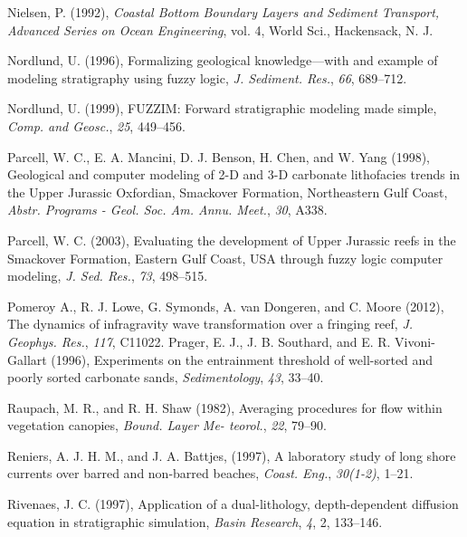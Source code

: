 \documentclass[default,jgrga]{agutex2015}
\begin{document}
\begin{article}
\begin{thebibliography}{}
Nielsen, P. (1992), \textit{Coastal Bottom Boundary Layers and Sediment Transport, Advanced Series on Ocean Engineering}, vol. 4, World Sci., Hackensack, N. J.

Nordlund, U. (1996), Formalizing geological knowledge—with and example of modeling stratigraphy using fuzzy logic, \textit{J. Sediment. Res.}, \textit{66}, 689--712.

Nordlund, U. (1999), FUZZIM: Forward stratigraphic modeling made simple, \textit{Comp. and Geosc.}, \textit{25}, 449--456.

Parcell, W. C., E. A. Mancini, D. J. Benson, H. Chen, and W. Yang (1998), Geological and computer modeling of 2-D and 3-D carbonate lithofacies trends in the Upper Jurassic Oxfordian, Smackover Formation, Northeastern Gulf Coast, \textit{Abstr. Programs - Geol. Soc. Am. Annu. Meet.}, \textit{30}, A338.

Parcell, W. C. (2003), Evaluating the development of Upper Jurassic reefs in the Smackover Formation, Eastern Gulf Coast, USA through fuzzy logic computer modeling, \textit{J. Sed. Res.}, \textit{73}, 498--515.

Pomeroy A., R. J. Lowe, G. Symonds, A. van Dongeren,  and C. Moore (2012), The dynamics of infragravity wave transformation over a fringing reef, \textit{J. Geophys. Res.}, \textit{117}, C11022.
Prager, E. J., J. B. Southard, and E. R. Vivoni-Gallart (1996), Experiments on the entrainment threshold of well-sorted and poorly sorted carbonate sands, \textit{Sedimentology}, \textit{43}, 33--40.

Raupach, M. R., and R. H. Shaw (1982), Averaging procedures for flow within vegetation canopies, \textit{Bound. Layer Me-
teorol.}, \textit{22}, 79--90.

Reniers, A. J. H. M., and J. A. Battjes, (1997), A laboratory study of long shore currents over barred and non-barred beaches,  \textit{Coast. Eng.}, \textit{30(1-2)}, 1--21.

Rivenaes, J. C. (1997), Application of a dual-lithology, depth-dependent diffusion equation in stratigraphic simulation, \textit{Basin Research}, \textit{4}, 2, 133--146.


\end{thebibliography}
\end{article}
\end{document}
